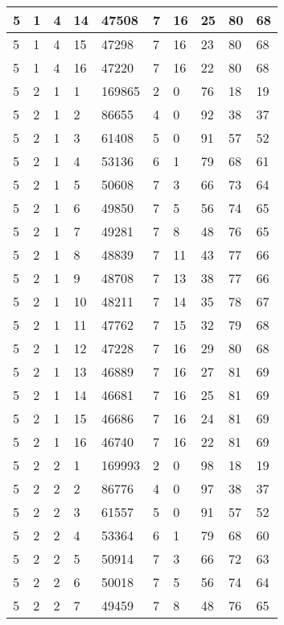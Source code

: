\begin{table}[!ht]
\begin{tabular}{|l|l|l|l|l|l|l|l|l|l|}
        5 & 1 & 4 & 14 & 47508 & 7 & 16 & 25 & 80 & 68 \\ \hline
        5 & 1 & 4 & 15 & 47298 & 7 & 16 & 23 & 80 & 68 \\ \hline
        5 & 1 & 4 & 16 & 47220 & 7 & 16 & 22 & 80 & 68 \\ \hline
        5 & 2 & 1 & 1 & 169865 & 2 & 0 & 76 & 18 & 19 \\ \hline
        5 & 2 & 1 & 2 & 86655 & 4 & 0 & 92 & 38 & 37 \\ \hline
        5 & 2 & 1 & 3 & 61408 & 5 & 0 & 91 & 57 & 52 \\ \hline
        5 & 2 & 1 & 4 & 53136 & 6 & 1 & 79 & 68 & 61 \\ \hline
        5 & 2 & 1 & 5 & 50608 & 7 & 3 & 66 & 73 & 64 \\ \hline
        5 & 2 & 1 & 6 & 49850 & 7 & 5 & 56 & 74 & 65 \\ \hline
        5 & 2 & 1 & 7 & 49281 & 7 & 8 & 48 & 76 & 65 \\ \hline
        5 & 2 & 1 & 8 & 48839 & 7 & 11 & 43 & 77 & 66 \\ \hline
        5 & 2 & 1 & 9 & 48708 & 7 & 13 & 38 & 77 & 66 \\ \hline
        5 & 2 & 1 & 10 & 48211 & 7 & 14 & 35 & 78 & 67 \\ \hline
        5 & 2 & 1 & 11 & 47762 & 7 & 15 & 32 & 79 & 68 \\ \hline
        5 & 2 & 1 & 12 & 47228 & 7 & 16 & 29 & 80 & 68 \\ \hline
        5 & 2 & 1 & 13 & 46889 & 7 & 16 & 27 & 81 & 69 \\ \hline
        5 & 2 & 1 & 14 & 46681 & 7 & 16 & 25 & 81 & 69 \\ \hline
        5 & 2 & 1 & 15 & 46686 & 7 & 16 & 24 & 81 & 69 \\ \hline
        5 & 2 & 1 & 16 & 46740 & 7 & 16 & 22 & 81 & 69 \\ \hline
        5 & 2 & 2 & 1 & 169993 & 2 & 0 & 98 & 18 & 19 \\ \hline
        5 & 2 & 2 & 2 & 86776 & 4 & 0 & 97 & 38 & 37 \\ \hline
        5 & 2 & 2 & 3 & 61557 & 5 & 0 & 91 & 57 & 52 \\ \hline
        5 & 2 & 2 & 4 & 53364 & 6 & 1 & 79 & 68 & 60 \\ \hline
        5 & 2 & 2 & 5 & 50914 & 7 & 3 & 66 & 72 & 63 \\ \hline
        5 & 2 & 2 & 6 & 50018 & 7 & 5 & 56 & 74 & 64 \\ \hline
        5 & 2 & 2 & 7 & 49459 & 7 & 8 & 48 & 76 & 65 \\ \hline

\end{tabular}
\end{table}
